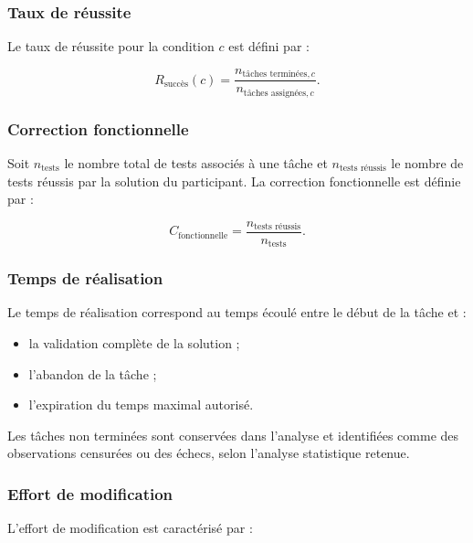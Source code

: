 \subsubsection{Taux de réussite}

Le taux de réussite pour la condition $c$ est défini par :

\begin{equation}
R_{\text{succès}}(c)
=
\frac{
    n_{\text{tâches terminées},c}
}{
    n_{\text{tâches assignées},c}
}.
\end{equation}


\subsubsection{Correction fonctionnelle}

Soit $n_{\mathrm{tests}}$ le nombre total de tests associés à une tâche
et $n_{\text{tests réussis}}$ le nombre de tests réussis par la
solution du participant. La correction fonctionnelle est définie par :

\begin{equation}
C_{\mathrm{fonctionnelle}}
=
\frac{
    n_{\text{tests réussis}}
}{
    n_{\mathrm{tests}}
}.
\end{equation}


\subsubsection{Temps de réalisation}

Le temps de réalisation correspond au temps écoulé entre le début de la
tâche et :

\begin{itemize}
    \item la validation complète de la solution ;
    \item l'abandon de la tâche ;
    \item l'expiration du temps maximal autorisé.
\end{itemize}

Les tâches non terminées sont conservées dans l'analyse et identifiées
comme des observations censurées ou des échecs, selon l'analyse
statistique retenue.


\subsubsection{Effort de modification}

L'effort de modification est caractérisé par :

